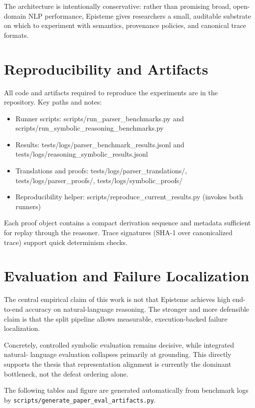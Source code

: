 \documentclass[11pt]{article}
\begin{document}
The architecture is intentionally conservative: rather than promising broad, open-domain
NLP performance, Episteme gives researchers a small, auditable substrate on which to
experiment with semantics, provenance policies, and canonical trace formats.

\section{Reproducibility and Artifacts}
All code and artifacts required to reproduce the experiments are in the repository.
Key paths and notes:
\begin{itemize}
  \item Runner scripts: scripts/run_parser_benchmarks.py and scripts/run_symbolic_reasoning_benchmarks.py
  \item Results: tests/logs/parser_benchmark_results.jsonl and tests/logs/reasoning_symbolic_results.jsonl
  \item Translations and proofs: tests/logs/parser_translations/, tests/logs/parser_proofs/, tests/logs/symbolic_proofs/
  \item Reproducibility helper: scripts/reproduce_current_results.py (invokes both runners)
\end{itemize}

Each proof object contains a compact derivation sequence and metadata sufficient for
replay through the reasoner. Trace signatures (SHA-1 over canonicalized trace) support
quick determinism checks.

\section{Evaluation and Failure Localization}
The central empirical claim of this work is not that Episteme achieves high end-to-end
accuracy on natural-language reasoning. The stronger and more defensible claim is that
the split pipeline allows measurable, execution-backed failure localization.

Concretely, controlled symbolic evaluation remains decisive, while integrated natural-
language evaluation collapses primarily at grounding. This directly supports the thesis
that representation alignment is currently the dominant bottleneck, not the defeat
ordering alone.

The following tables and figure are generated automatically from benchmark logs by
\texttt{scripts/generate\_paper\_eval\_artifacts.py}.


\end{document}
